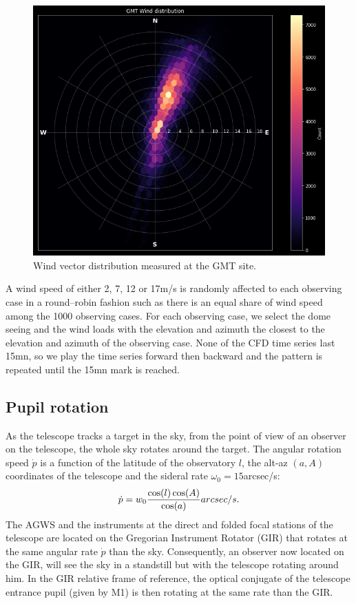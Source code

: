 \documentclass{gmto}
\begin{document}
\begin{figure}
  \centering
  \includegraphics[width=0.8\linewidth]{wind_distribution.png}
  \caption{Wind vector distribution measured at the GMT site.}
  \label{fig:9}
\end{figure}

A wind speed of either 2, 7, 12 or 17m/s is randomly affected to each observing case in a round--robin fashion such as there is an equal share of wind speed among the 1000 observing cases.
For each observing case, we select the dome seeing and the wind loads with the elevation and azimuth the closest to the elevation and azimuth of the observing case.
None of the CFD time series last 15mn, so we play the time series forward then backward and the pattern is repeated until the 15mn mark is reached.


\subsection{Pupil rotation}
\label{sec:pupil-rotation}

As the telescope tracks a target in the sky, from the point of view of an
observer on the telescope, the whole sky rotates around the target.
The angular rotation speed $\dot{p}$ is a function of the latitude of the observatory $l$,
the alt-az $(a,A)$ coordinates of the telescope and the sideral rate $\omega_0=15$arcsec/s:
\begin{equation}
  \label{eq:9}
  \dot{p} = w_0{\cos(l)\cos(A)\over\cos(a)} arcsec/s.
\end{equation}
The AGWS and the instruments at the direct and folded focal stations of the telescope are
located on the Gregorian Instrument Rotator (GIR) that rotates at the same
angular rate $\dot p$ than the sky.
Consequently, an observer now located on the GIR, will see the sky in a
standstill but with the telescope rotating around him.
In the GIR relative frame of reference, the optical conjugate of the telescope
entrance pupil (given by M1) is then rotating
at the same rate than the GIR.
\end{document}
